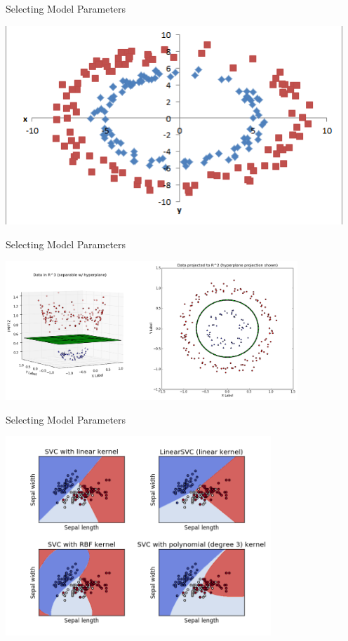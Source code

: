 \documentclass[10pt]{beamer}
\begin{document}
\begin{frame}[fragile]{Selecting Model Parameters}

    \centerline{\includegraphics[height=7.5cm]{svmcircles.png}}


\end{frame}

\begin{frame}[fragile]{Selecting Model Parameters}

    \centerline{\includegraphics[width=11cm]{implicitprojection.png}}


\end{frame}

\begin{frame}[fragile]{Selecting Model Parameters}

    \centerline{\includegraphics[width=10cm]{kernels.png}}


\end{frame}
\end{document}
